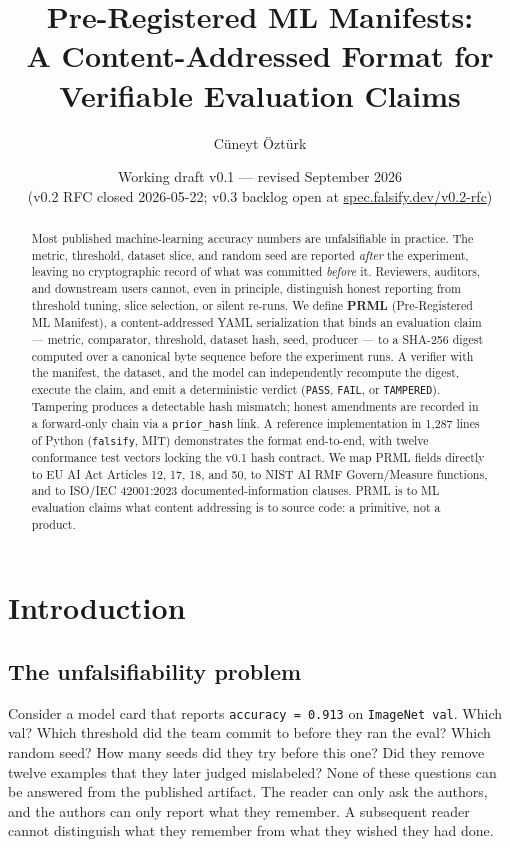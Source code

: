 \documentclass[11pt, a4paper]{article}
\title{\bfseries Pre-Registered ML Manifests:\\
A Content-Addressed Format for Verifiable Evaluation Claims}
\author[1]{C\"uneyt \"Ozt\"urk}
\affil[1]{Falsify O\"U, Tallinn. Correspondence: \href{mailto:hello@falsify.dev}{hello@falsify.dev}\\
Spec: \href{https://spec.falsify.dev/v0.1}{spec.falsify.dev/v0.1} \quad
Code: \href{https://github.com/studio-11-co/falsify}{github.com/studio-11-co/falsify} \quad
DOI: \href{https://doi.org/10.5281/zenodo.20177839}{10.5281/zenodo.20177839}}
\date{Working draft v0.1 --- revised September 2026\\ {\small (v0.2 RFC closed 2026-05-22; v0.3 backlog open at \href{https://spec.falsify.dev/v0.2-rfc}{spec.falsify.dev/v0.2-rfc})}}
\begin{document}
\maketitle

\begin{abstract}
\noindent
Most published machine-learning accuracy numbers are unfalsifiable in practice. The metric, threshold, dataset slice, and random seed are reported \emph{after} the experiment, leaving no cryptographic record of what was committed \emph{before} it. Reviewers, auditors, and downstream users cannot, even in principle, distinguish honest reporting from threshold tuning, slice selection, or silent re-runs. We define \textbf{PRML} (Pre-Registered ML Manifest), a content-addressed YAML serialization that binds an evaluation claim --- metric, comparator, threshold, dataset hash, seed, producer --- to a SHA-256 digest computed over a canonical byte sequence before the experiment runs. A verifier with the manifest, the dataset, and the model can independently recompute the digest, execute the claim, and emit a deterministic verdict (\texttt{PASS}, \texttt{FAIL}, or \texttt{TAMPERED}). Tampering produces a detectable hash mismatch; honest amendments are recorded in a forward-only chain via a \texttt{prior\_hash} link. A reference implementation in 1{,}287 lines of Python (\texttt{falsify}, MIT) demonstrates the format end-to-end, with twelve conformance test vectors locking the v0.1 hash contract. We map PRML fields directly to EU AI Act Articles 12, 17, 18, and 50, to NIST AI RMF Govern/Measure functions, and to ISO/IEC 42001:2023 documented-information clauses. PRML is to ML evaluation claims what content addressing is to source code: a primitive, not a product.
\end{abstract}

\section{Introduction}
\label{sec:intro}

\subsection{The unfalsifiability problem}

Consider a model card that reports \texttt{accuracy = 0.913} on \texttt{ImageNet val}. Which val? Which threshold did the team commit to before they ran the eval? Which random seed? How many seeds did they try before this one? Did they remove twelve examples that they later judged mislabeled? None of these questions can be answered from the published artifact. The reader can only ask the authors, and the authors can only report what they remember. A subsequent reader cannot distinguish what they remember from what they wished they had done.
\end{document}
